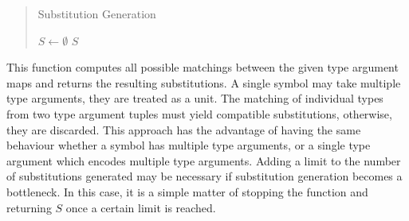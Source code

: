 \documentclass[]{ceurart}
\begin{document}
\begin{quote}
\begin{algorithm}[H]
   \caption{Substitution Generation}

   \BlankLine

   \(S\leftarrow \emptyset\)\;
   \Return \(S\)\;
\end{algorithm}
\end{quote}

This function computes all possible matchings between the given type argument maps and returns the resulting substitutions. A single symbol may take multiple type arguments, they are treated as a unit. The matching of individual types from two type argument tuples must yield compatible substitutions, otherwise, they are discarded. This approach has the advantage of having the same behaviour whether a symbol has multiple type arguments, or a single type argument which encodes multiple type arguments. Adding a limit to the number of substitutions generated may be necessary if substitution generation becomes a bottleneck. In this case, it is a simple matter of stopping the function and returning \(S\) once a certain limit is reached.
\end{document}
